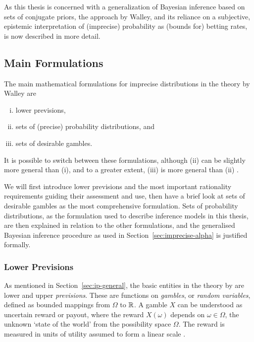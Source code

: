 As this thesis is concerned with a generalization of Bayesian inference
based on sets of conjugate priors, the approach by Walley,
and its reliance on a subjective, epistemic interpretation of (imprecise) probability
as (bounds for) betting rates, is now described in more detail.


\subsection{Main Formulations}
\label{sec:ip-main}


The main mathematical formulations for imprecise distributions
in the theory by Walley \parencite*{1991:walley, 2000:walley::towards}
are
\begin{enumerate}[(i)]
\item lower previsions,
\item sets of (precise) probability distributions, and
\item sets of desirable gambles.
\end{enumerate}
It is possible to switch between these formulations,
although (ii) can be slightly more general than (i),
and to a greater extent, (iii) is more general than (ii) \parencite{2000:walley::towards}.

We will first introduce lower previsions
and the most important rationality requirements guiding their assessment and use,
then have a brief look at sets of desirable gambles as the most comprehensive formulation.
Sets of probability distributions, as the formulation used to describe inference models in this thesis,
are then explained in relation to the other formulations,
and the generalised Bayesian inference procedure as used in Section~\ref{sec:imprecise-alpha} is justified formally.

\subsubsection{Lower Previsions}

As mentioned in Section~\ref{sec:ip-general}, the basic entities in the theory by \textcite{1991:walley}
are lower and upper \emph{previsions}.
These are functions on \emph{gambles}, or \emph{random variables},
defined as bounded mappings from $\Omega$ to $\mathbb{R}$.
A gamble $X$ can be understood as uncertain reward or payout,
where the reward $X(\omega)$ depends on $\omega \in \Omega$,
the unknown `state of the world' from the possibility space $\Omega$.
The reward is measured in units of utility assumed to form a linear scale
\parencite[\S 2.2]{1991:walley}.

